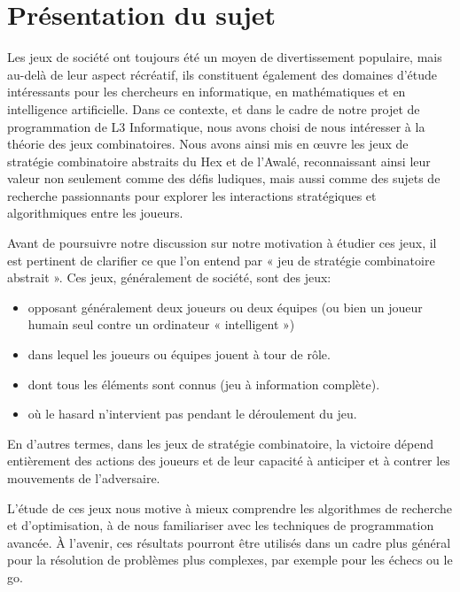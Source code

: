\section{Présentation du sujet}
Les jeux de société ont toujours été un moyen de divertissement populaire, mais au-delà 
de leur aspect récréatif, ils constituent également des domaines d'étude intéressants pour les 
chercheurs en informatique, en mathématiques et en intelligence artificielle. 
Dans ce contexte, et dans le cadre de notre projet de programmation de L3 Informatique, 
nous avons choisi de nous intéresser à la théorie des jeux combinatoires. Nous avons ainsi mis 
en œuvre les jeux de stratégie combinatoire abstraits du Hex et de l'Awalé, reconnaissant ainsi 
leur valeur non seulement comme des défis ludiques, mais aussi comme des sujets de recherche 
passionnants pour explorer les interactions stratégiques et algorithmiques entre les joueurs.

Avant de poursuivre notre discussion sur notre motivation à étudier ces jeux, il est pertinent
de clarifier ce que l'on entend par « jeu de stratégie combinatoire abstrait ». Ces jeux, généralement de société, sont des jeux:
\begin{itemize}
	\item opposant généralement deux joueurs ou deux équipes (ou bien un joueur humain seul 
	contre un ordinateur « intelligent »)
	\item dans lequel les joueurs ou équipes jouent à tour de rôle.
	\item dont tous les éléments sont connus (jeu à information complète).
	\item où le hasard n'intervient pas pendant le déroulement du jeu.
\end{itemize}
En d'autres termes, dans les jeux de stratégie combinatoire, la victoire dépend entièrement 
des actions des joueurs et de leur capacité à anticiper et à contrer les mouvements de l'adversaire. 


L'étude de ces jeux nous motive à mieux comprendre les algorithmes de 
recherche et d'optimisation, à de nous familiariser avec les techniques de 
programmation avancée. À l'avenir, ces résultats pourront être utilisés dans
un cadre plus général pour la résolution de problèmes plus complexes, par exemple
pour les échecs ou le go. 



